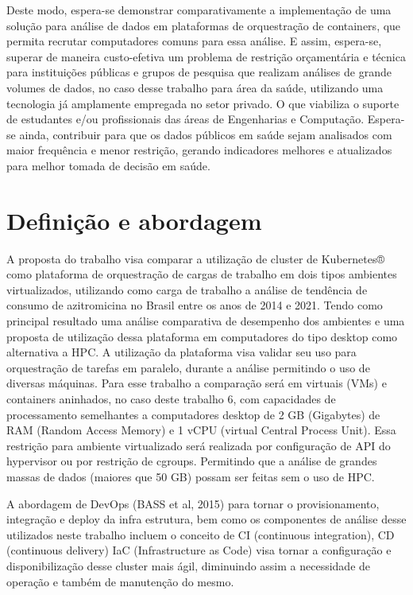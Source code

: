 Deste modo, espera-se demonstrar comparativamente a implementação de uma solução para análise de dados em plataformas de orquestração de containers, que permita recrutar computadores comuns para essa análise. E assim, espera-se, superar de maneira custo-efetiva um problema de restrição orçamentária e técnica para instituições públicas e grupos de pesquisa que realizam análises de grande volumes de dados, no caso desse trabalho para área da saúde, utilizando uma tecnologia já amplamente empregada no setor privado. O que viabiliza o suporte de estudantes e/ou profissionais das áreas de Engenharias e Computação. Espera-se ainda, contribuir para que os dados públicos em saúde sejam analisados com  maior frequência e menor restrição, gerando indicadores melhores e atualizados para melhor tomada de decisão em saúde. 

\section{Definição e abordagem}
\label{sec:abordagem}

A proposta do trabalho visa comparar a utilização de cluster de Kubernetes® como plataforma de orquestração de cargas de trabalho em dois tipos ambientes virtualizados, utilizando como carga de trabalho a análise de tendência de consumo de azitromicina no Brasil entre os anos de 2014 e 2021. Tendo como principal resultado uma análise comparativa de desempenho dos ambientes e uma proposta de utilização dessa plataforma em computadores do tipo desktop como alternativa a HPC. 
A utilização da plataforma visa validar seu uso para orquestração de tarefas em paralelo, durante a análise permitindo o uso de diversas máquinas. Para esse trabalho a comparação será em virtuais (VMs) e containers aninhados, no caso deste trabalho 6, com capacidades de processamento semelhantes a computadores desktop de 2 GB (Gigabytes) de RAM (Random Access Memory) e 1 vCPU (virtual Central Process Unit). Essa restrição para ambiente virtualizado será realizada por configuração de API do hypervisor ou por restrição de cgroups. Permitindo que a análise de grandes massas de dados (maiores que 50 GB) possam ser feitas sem o uso de HPC. 

A abordagem de DevOps (BASS et al, 2015) para tornar o provisionamento, integração e deploy da infra estrutura, bem como os componentes de análise desse utilizados neste trabalho incluem o conceito de CI (continuous integration), CD (continuous delivery)  IaC (Infrastructure as Code) visa tornar a configuração e disponibilização desse cluster mais ágil, diminuindo assim a necessidade de operação e também de manutenção do mesmo.

